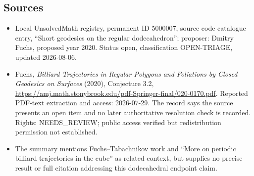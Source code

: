 \documentclass[11pt]{article}
\begin{document}
\subsection{Sources}
\begin{itemize}
\item Local UnsolvedMath registry, permanent ID 5000007, source code catalogue entry, ``Short geodesics on the regular dodecahedron''; proposer: Dmitry Fuchs, proposed year 2020. Status open, classification OPEN-TRIAGE, updated 2026-08-06.
\item Fuchs, \emph{Billiard Trajectories in Regular Polygons and Foliations by Closed Geodesics on Surfaces} (2020), Conjecture 3.2, \url{https://amj.math.stonybrook.edu/pdf-Springer-final/020-0170.pdf}. Reported PDF-text extraction and access: 2026-07-29. The record says the source presents an open item and no later authoritative resolution check is recorded. Rights: NEEDS\_REVIEW; public access verified but redistribution permission not established.
\item The summary mentions Fuchs--Tabachnikov work and ``More on periodic billiard trajectories in the cube'' as related context, but supplies no precise result or full citation addressing this dodecahedral endpoint claim.
\end{itemize}
\end{document}
